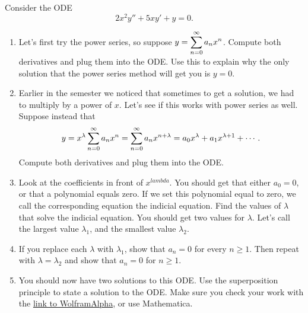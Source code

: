 \begin{problem}%
Consider the ODE $$2x^2y''+5xy'+y=0.$$  
\begin{enumerate}
 \item Let's first try the power series, so suppose $\displaystyle y=\sum_{n=0}^\infty a_n x^n$. Compute both derivatives and plug them into the ODE. Use this to explain why the only solution that the power series method will get you is $y=0$.
 \item {}%
Earlier in the semester we noticed that sometimes to get a solution, we had to multiply by a power of $x$. Let's see if this works with power series as well.  Suppose instead that 
$$\displaystyle y=x^\lambda \sum_{n=0}^\infty a_n x^n = \sum_{n=0}^\infty a_n x^{n+\lambda} = a_0 x^\lambda +a_1 x^{\lambda+1}+\cdots .$$ 
 Compute both derivatives and plug them into the ODE. %
 \item Look at the coefficients in front of $x^{lambda}$. You should get that either $a_0=0$, or that a polynomial equals zero. If we set this polynomial equal to zero, we call the corresponding equation the indicial equation.  Find the values of $\lambda$ that solve the indicial equation. You should get two values for $\lambda$. Let's call the largest value $\lambda_1$, and the smallest value $\lambda_2$. 
 \item If you replace each $\lambda$ with $\lambda_1$, show that $a_n=0$ for every $n\geq 1$.  Then  repeat with $\lambda=\lambda_2$ and show that $a_n=0$ for $n\geq 1$.  
 \item {}
You should now have two solutions to this ODE.  Use the superposition principle to state a solution to the ODE.  Make sure you check your work with the \href{http://www.wolframalpha.com/input/?i=dsolve+2x\%5E2+y\%27\%27+\%2B5x+y\%27+\%2By\%3D0}{link to WolframAlpha}, or use Mathematica.
\end{enumerate}

\end{problem}


